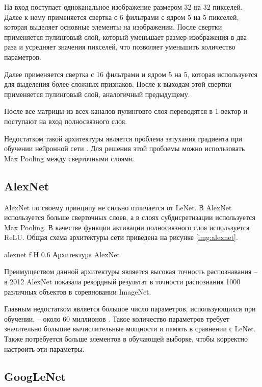 На вход поступает одноканальное изображение размером 32 на 32 пикселей. Далее к нему применяется свертка с 6 фильтрами с ядром 5 на 5 пикселей, которая выделяет основные элементы на изображении. После свертки применяется пулинговый слой, который уменьшает размер изображения в два раза и усредняет значения пикселей, что позволяет уменьшить количество параметров.

Далее применяется свертка с 16 фильтрами и ядром 5 на 5, которая используется для выделения более сложных признаков. После к выходам этой свертки применяется пулинговый слой, аналогичный предыдущему. 

После все матрицы из всех каналов пулинговго слоя переводятся в 1 вектор и поступают на вход полносвязного слоя.

Недостатком такой архитектуры является проблема затухания градиента при обучении нейронной сети \cite{architectures}. Для решения этой проблемы можно использовать Max Pooling между сверточными слоями.

\subsection{AlexNet}

AlexNet по своему принципу не сильно отличается от LeNet. В AlexNet используется больше сверточных слоев, а в слоях субдисретизации используется Max Pooling. В качестве функции активации полносвязного слоя используется ReLU. Общая схема архитектуры сети приведена на рисунке \ref{img:alexnet}.

{alexnet} %
{f} %
{H} %
{0.6\textwidth} %
{Архитектура AlexNet} %

Преимуществом данной архитектуры является высокая точность распознавания -- в 2012 AlexNet показала рекордный результат в точности распознания 1000 различных объектов в соревновании ImageNet.

Главным недостатком является большое число параметров, использующихся при обучении, -- около 60 миллионов \cite{architectures}. Такое количество параметров требует значительно большие вычислительные мощности и память в сравнении с LeNet. Также потребуется больше элементов в обучающей выборке, чтобы корректно настроить эти параметры.

\subsection{GoogLeNet}

